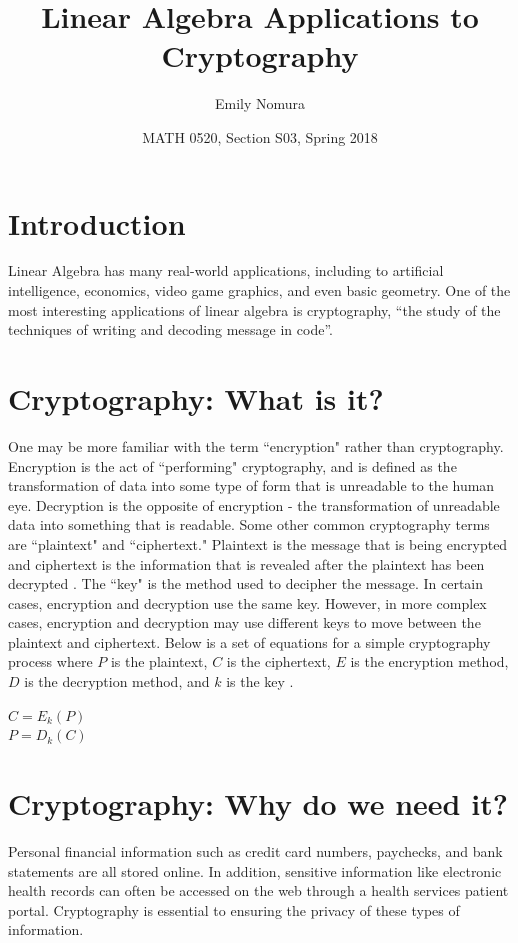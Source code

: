 \documentclass{article}
\title{Linear Algebra Applications to Cryptography}
\author{Emily Nomura}
\date{MATH 0520, Section S03, Spring 2018}
\begin{document}
\maketitle

\section{Introduction}
Linear Algebra has many real-world applications, including to artificial intelligence, economics, video game graphics, and even basic geometry. One of the most interesting applications of linear algebra is cryptography, “the study of the techniques of writing and decoding message in code”\cite{ref1:1}. 

\section{Cryptography: What is it?}
 One may be more familiar with the term ``encryption" rather than cryptography. Encryption is the act of ``performing" cryptography, and is defined as the transformation of data into some type of form that is unreadable to the human eye. Decryption is the opposite of encryption - the transformation of unreadable data into something that is readable. Some other common cryptography terms are ``plaintext" and ``ciphertext." Plaintext is the message that is being encrypted and ciphertext is the information that is revealed after the plaintext has been decrypted \cite{ref1:1}. The ``key" is the method used to decipher the message. In certain cases, encryption and decryption use the same key. However, in more complex cases, encryption and decryption may use different keys to move between the plaintext and ciphertext. Below is a set of equations for a simple cryptography process where $P$ is the plaintext, $C$ is the ciphertext, $E$ is the encryption method, $D$ is the decryption method, and $k$ is the key \cite{ref2:2}.

{\center $C = E_{k}(P)$\\
$P = D_{k}(C)$
\endcenter}

\section{Cryptography: Why do we need it?}
Personal financial information such as credit card numbers, paychecks, and bank statements are all stored online. In addition, sensitive information like electronic health records can often be accessed on the web through a health services patient portal. Cryptography is essential to ensuring the privacy of these types of information.\\
\end{document}
